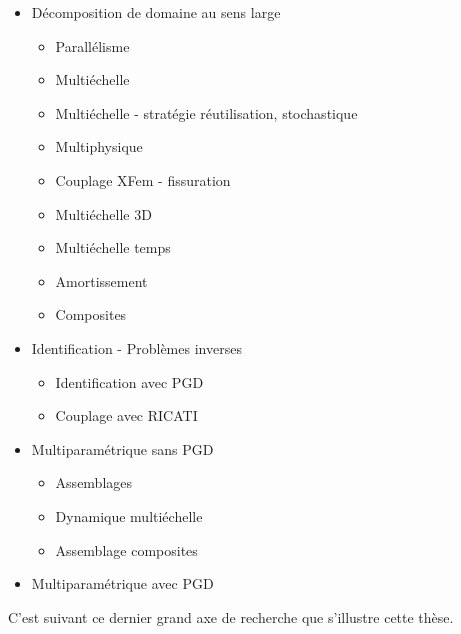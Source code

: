 \begin{itemize}
\item Décomposition de domaine au sens large\\
\begin{itemize}
\item Parallélisme \cite{Ladeveze1987,Lorong1994,Dureisseix1997b}
\item Multiéchelle \cite{Ladeveze1999bb,Loiseau2001b}
\item Multiéchelle - stratégie réutilisation, stochastique \cite{Ladeveze2002}
\item Multiphysique \cite{Dureisseix03}
\item Couplage XFem - fissuration \cite{Guidault2005b}
\item Multiéchelle 3D \cite{Violeau2007b}
\item Multiéchelle temps \cite{Lad10}
\item Amortissement \cite{Caignot2009b}
\item Composites \cite{Kerfriden2008b}\\
\end{itemize}

\item Identification - Problèmes inverses\\
\begin{itemize}
\item Identification avec PGD \cite{Allix2002}
\item Couplage avec RICATI \cite{Nguyen2008}\\
\end{itemize}

\item Multiparamétrique sans PGD\\
\begin{itemize}
\item Assemblages \cite{Boucard03}
\item Dynamique multiéchelle \cite{Odievre2009b}
\item Assemblage composites \cite{Roulet2011d}\\
\end{itemize}

\item Multiparamétrique avec PGD 
\cite{Relun12}\\

\end{itemize}

C'est suivant ce dernier grand axe de recherche que s'illustre cette thèse.\\

